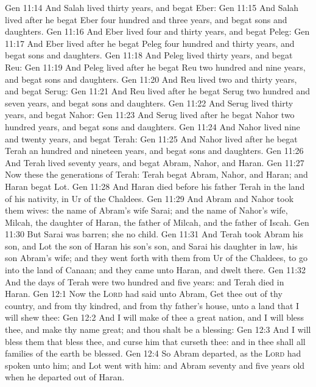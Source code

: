 \vs Gen 11:14 And Salah lived thirty years, and begat Eber:
\vs Gen 11:15 And Salah lived after he begat Eber four hundred and three years, and begat sons and daughters.
\vs Gen 11:16 And Eber lived four and thirty years, and begat Peleg:
\vs Gen 11:17 And Eber lived after he begat Peleg four hundred and thirty years, and begat sons and daughters.
\vs Gen 11:18 And Peleg lived thirty years, and begat Reu:
\vs Gen 11:19 And Peleg lived after he begat Reu two hundred and nine years, and begat sons and daughters.
\vs Gen 11:20 And Reu lived two and thirty years, and begat Serug:
\vs Gen 11:21 And Reu lived after he begat Serug two hundred and seven years, and begat sons and daughters.
\vs Gen 11:22 And Serug lived thirty years, and begat Nahor:
\vs Gen 11:23 And Serug lived after he begat Nahor two hundred years, and begat sons and daughters.
\vs Gen 11:24 And Nahor lived nine and twenty years, and begat Terah:
\vs Gen 11:25 And Nahor lived after he begat Terah an hundred and nineteen years, and begat sons and daughters.
\vs Gen 11:26 And Terah lived seventy years, and begat Abram, Nahor, and Haran.
\vs Gen 11:27 Now these  the generations of Terah: Terah begat Abram, Nahor, and Haran; and Haran begat Lot.
\vs Gen 11:28 And Haran died before his father Terah in the land of his nativity, in Ur of the Chaldees.
\vs Gen 11:29 And Abram and Nahor took them wives: the name of Abram's wife  Sarai; and the name of Nahor's wife, Milcah, the daughter of Haran, the father of Milcah, and the father of Iscah.
\vs Gen 11:30 But Sarai was barren; she  no child.
\vs Gen 11:31 And Terah took Abram his son, and Lot the son of Haran his son's son, and Sarai his daughter in law, his son Abram's wife; and they went forth with them from Ur of the Chaldees, to go into the land of Canaan; and they came unto Haran, and dwelt there.
\vs Gen 11:32 And the days of Terah were two hundred and five years: and Terah died in Haran.
\vs Gen 12:1 Now the \textsc{Lord} had said unto Abram, Get thee out of thy country, and from thy kindred, and from thy father's house, unto a land that I will shew thee:
\vs Gen 12:2 And I will make of thee a great nation, and I will bless thee, and make thy name great; and thou shalt be a blessing:
\vs Gen 12:3 And I will bless them that bless thee, and curse him that curseth thee: and in thee shall all families of the earth be blessed.
\vs Gen 12:4 So Abram departed, as the \textsc{Lord} had spoken unto him; and Lot went with him: and Abram  seventy and five years old when he departed out of Haran.
